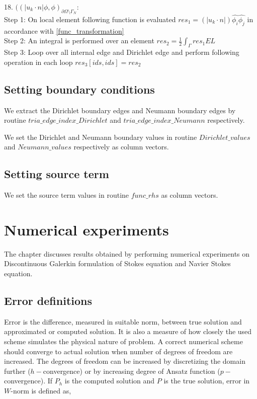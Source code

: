\documentclass[a4paper,12pt]{book}
\begin{document}
18. $((|u_k \cdot n| \phi,\phi)_{\partial \Omega \setminus \Gamma_N}$:\\
Step 1: On local element following function is evaluated $res_1 = (|u_k \cdot n|) \hat{\phi_i} \hat{\phi_j} $ in accordance with \ref{func_transformation}\\
Step 2: An integral is performed over an element $res_2 = \frac{1}{2} \int_{\Gamma} res_1 EL $\\
Step 3: Loop over all internal edge and Dirichlet edge and perform following operation in each loop $res_3[ids,ids] = res_2$\\

\section{Setting boundary conditions}

We extract the Dirichlet boundary edges and Neumann boundary edges by routine $tria\_edge\_index\_Dirichlet$ and $tria\_edge\_index\_Neumann$ respectively.

We set the Dirichlet and Neumann boundary values in routine $Dirichlet\_values$ and $Neumann\_values$ respectively as column vectors. 

\section{Setting source term}

We set the source term values in routine $func\_rhs$ as column vectors. 

\chapter{Numerical experiments}

The chapter discusses results obtained by performing numerical experiments on Discontinuous Galerkin formulation of Stokes equation and Navier Stokes equation.

\section{Error definitions}

Error is the difference, measured in suitable norm, between true solution and approximated or computed solution. It is also a measure of how closely the used scheme simulates the physical nature of problem. A correct numerical scheme should converge to actual solution when number of degrees of freedom are increased. The degrees of freedom can be increased by discretizing the domain further ($h-$convergence) or by increasing degree of Ansatz function ($p-$convergence). If $P_h$ is the computed solution and $P$ is the true solution, error in $W$-norm is defined as,
\end{document}
